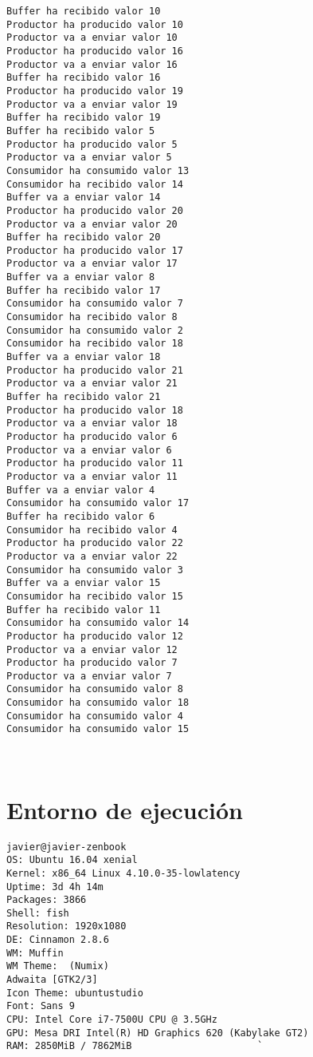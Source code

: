 \documentclass[12pt,a4paper]{article}
\begin{document}
\begin{verbatim}
Buffer ha recibido valor 10
Productor ha producido valor 10
Productor va a enviar valor 10
Productor ha producido valor 16
Productor va a enviar valor 16
Buffer ha recibido valor 16
Productor ha producido valor 19
Productor va a enviar valor 19
Buffer ha recibido valor 19
Buffer ha recibido valor 5
Productor ha producido valor 5
Productor va a enviar valor 5
Consumidor ha consumido valor 13
Consumidor ha recibido valor 14
Buffer va a enviar valor 14
Productor ha producido valor 20
Productor va a enviar valor 20
Buffer ha recibido valor 20
Productor ha producido valor 17
Productor va a enviar valor 17
Buffer va a enviar valor 8
Buffer ha recibido valor 17
Consumidor ha consumido valor 7
Consumidor ha recibido valor 8
Consumidor ha consumido valor 2
Consumidor ha recibido valor 18
Buffer va a enviar valor 18
Productor ha producido valor 21
Productor va a enviar valor 21
Buffer ha recibido valor 21
Productor ha producido valor 18
Productor va a enviar valor 18
Productor ha producido valor 6
Productor va a enviar valor 6
Productor ha producido valor 11
Productor va a enviar valor 11
Buffer va a enviar valor 4
Consumidor ha consumido valor 17
Buffer ha recibido valor 6
Consumidor ha recibido valor 4
Productor ha producido valor 22
Productor va a enviar valor 22
Consumidor ha consumido valor 3
Buffer va a enviar valor 15
Consumidor ha recibido valor 15
Buffer ha recibido valor 11
Consumidor ha consumido valor 14
Productor ha producido valor 12
Productor va a enviar valor 12
Productor ha producido valor 7
Productor va a enviar valor 7
Consumidor ha consumido valor 8
Consumidor ha consumido valor 18
Consumidor ha consumido valor 4
Consumidor ha consumido valor 15

	
\end{verbatim}


\newpage
\appendix
\section{Entorno de ejecución}
\begin{verbatim}
javier@javier-zenbook
OS: Ubuntu 16.04 xenial
Kernel: x86_64 Linux 4.10.0-35-lowlatency
Uptime: 3d 4h 14m
Packages: 3866
Shell: fish
Resolution: 1920x1080
DE: Cinnamon 2.8.6
WM: Muffin
WM Theme:  (Numix)
Adwaita [GTK2/3]
Icon Theme: ubuntustudio
Font: Sans 9
CPU: Intel Core i7-7500U CPU @ 3.5GHz
GPU: Mesa DRI Intel(R) HD Graphics 620 (Kabylake GT2) 
RAM: 2850MiB / 7862MiB                      `
\end{verbatim}
\end{document}
